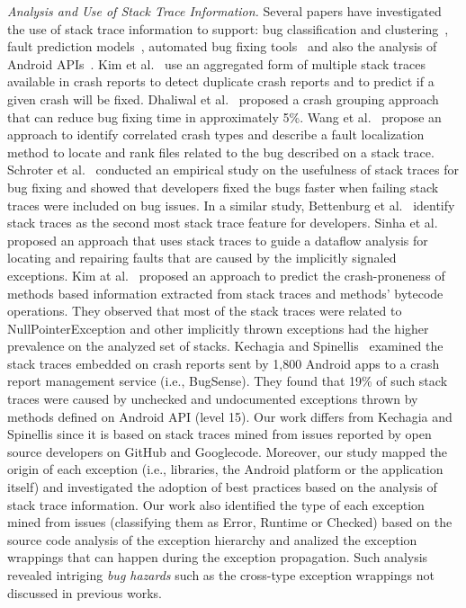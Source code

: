 \textit{Analysis and Use of Stack Trace Information.} Several papers have
investigated the use of stack trace information to support: bug classification
and clustering~\cite{wang2013improving, kim2011crash, dhaliwal2011classifying},
fault prediction models~\cite{kim2013predicting}, automated
bug fixing tools~\cite{sinha2009fault} and also the analysis of Android APIs~\cite{kechagia2014}. 
Kim et al.~\cite{kim2011crash} use an
aggregated form of multiple stack traces available in crash reports to detect
duplicate crash reports and to predict if a given crash will be fixed. Dhaliwal
et al.~\cite{dhaliwal2011classifying} proposed a crash grouping approach that
can reduce bug fixing time in approximately 5\%. Wang et
al.~\cite{wang2013improving} propose an approach to identify correlated crash
types and describe a fault localization method to locate and rank files related
to the bug described on a stack trace. Schroter et al.~\cite{schroter2010stack}
conducted an empirical study on the usefulness of stack traces for bug fixing
and showed that developers fixed the bugs faster when failing stack traces were
included on bug issues.  In a similar study, Bettenburg et
al.~\cite{bettenburg2008makes} identify stack traces as the second most stack
trace feature for developers.  Sinha et al.~\cite{sinha2009fault} proposed an
approach that uses stack traces to guide a dataflow analysis for locating and
repairing faults that are caused by the implicitly signaled exceptions. Kim
at al.~\cite{kim2013predicting} proposed an approach to predict the
crash-proneness of methods based information extracted from stack traces and
methods' bytecode operations.  They observed that most of the stack traces were
related to NullPointerException and other implicitly thrown exceptions had
the higher prevalence on the analyzed set of stacks. Kechagia and Spinellis~\cite{kechagia2014}
examined the stack traces embedded on crash reports sent by 1,800 Android apps 
to a crash report management service (i.e., BugSense). They found that 19\% of such stack traces
were caused by unchecked and undocumented exceptions thrown by methods defined on 
Android API (level 15). Our work differs from Kechagia and Spinellis since it is based on
stack traces mined from issues reported by open source developers on GitHub and Googlecode.  
Moreover, our study mapped the origin of each exception 
(i.e., libraries, the Android platform or the application itself) and investigated
the adoption of best practices based on the analysis of stack trace information.
Our work also identified the type of each exception mined from issues
(classifying them as Error, Runtime or Checked) based on the source code
analysis of the exception hierarchy and analized the exception wrappings that can 
happen during the exception propagation.  Such analysis revealed intriging 
\emph{bug hazards} such as the cross-type exception wrappings not discussed in previous works.


